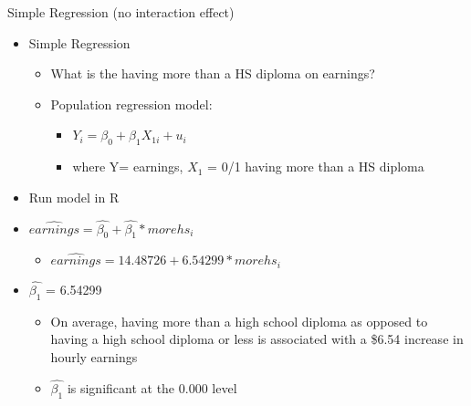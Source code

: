 \documentclass[8pt,ignorenonframetext,dvipsnames]{beamer}
\providecommand{\tightlist}{%
  \setlength{\itemsep}{0pt}\setlength{\parskip}{0pt}}
\let\olditem\item
\renewcommand{\item}{%
  \olditem\vspace{4pt}
}
\begin{document}
\begin{frame}{Simple Regression (no interaction effect)}
\protect\hypertarget{simple-regression-no-interaction-effect}{}

\begin{itemize}
\tightlist
\item
  Simple Regression

  \begin{itemize}
  \tightlist
  \item
    What is the having more than a HS diploma on earnings?
  \item
    Population regression model:

    \begin{itemize}
    \tightlist
    \item
      \(Y_i = \beta_0 + \beta_1X_{1i} + u_i\)
    \item
      where Y= earnings, \(X_{1}\) = 0/1 having more than a HS diploma
    \end{itemize}
  \end{itemize}
\item
  Run model in R
\item
  \(\hat{earnings} = \hat{\beta_0} + \hat{\beta_1}*morehs_{i}\)

  \begin{itemize}
  \tightlist
  \item
    \(\hat{earnings} = 14.48726 + 6.54299*morehs_{i}\)
  \end{itemize}
\item
  \(\hat{\beta_1}\) = 6.54299

  \begin{itemize}
  \tightlist
  \item
    On average, having more than a high school diploma as opposed to
    having a high school diploma or less is associated with a \$6.54
    increase in hourly earnings
  \item
    \(\hat{\beta_1}\) is significant at the 0.000 level
  \end{itemize}
\end{itemize}

\end{frame}
\end{document}
